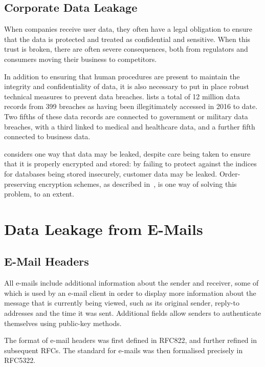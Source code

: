 \subsection{Corporate Data Leakage}

When companies receive user data, they often have a legal obligation to ensure
that the data is protected and treated as confidential and sensitive.  When
this trust is broken, there are often severe consequences, both from regulators
and consumers moving their business to competitors.

In addition to ensuring that human procedures are present to maintain the
integrity and confidentiality of data, it is also necessary to put in place
robust technical measures to prevent data breaches.
\cite{2016_data_breach_category_summary_2016} lists a total of 12 million data
records from 399 breaches as having been illegitimately accessed in 2016 to
date.  Two fifths of these data records are connected to government or military
data breaches, with a third linked to medical and healthcare data, and a
further fifth connected to business data.

\cite{squicciarini2010preventing} considers one way that data may be leaked,
despite care being taken to ensure that it is properly encrypted and stored: by
failing to protect against the indices for databases being stored insecurely,
customer data may be leaked.  Order-preserving encryption schemes, as described
in~\cite{agrawal2004order}, is one way of solving this problem, to an extent.

\section{Data Leakage from E-Mails}

\subsection{E-Mail Headers}

All e-mails include additional information about the sender and receiver, some
of which is used by an e-mail client in order to display more information about
the message that is currently being viewed, such as its original sender,
reply-to addresses and the time it was sent.  Additional fields allow senders
to authenticate themselves using public-key methods.

The format of e-mail headers was first defined in RFC822, and further refined
in subsequent RFCs.  The standard for e-mails was then formalised precisely in
RFC5322.

